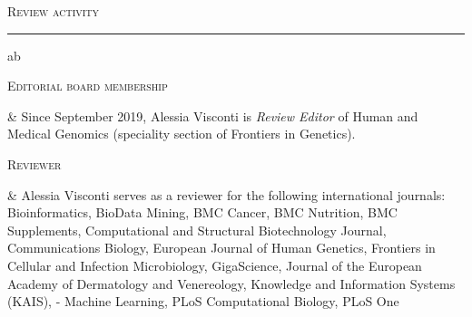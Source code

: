 \documentclass[a4paper,10pt]{article}
\newcommand{\mediumtitle}[1]{
	\vspace{0.2cm}
	{\noindent
	\Large \textsc{#1}\\[-2ex]
	\hrule
	\vspace{0.2cm}}
}
\newenvironment{singletablelist}
{	\vspace{-0.2cm}
	\begin{longtable}[!h]{ab}}{\end{longtable}
}
\newcommand{\stlist}[2]{
	\hspace{-3cm}
	\noindent
	\begin{minipage}{0.24\textwidth}
	\begin{flushright}
	\textsc{#1}
	\end{flushright}
	\end{minipage}
	& #2\\[0.2cm]
}
\begin{document}
\mediumtitle{Review activity}

\begin{singletablelist}

\stlist{Editorial board membership}{ Since September 2019, Alessia Visconti is \emph{Review Editor} of Human and Medical Genomics (speciality section of Frontiers in Genetics).}
\stlist{Reviewer}{ Alessia Visconti serves as a reviewer for the following international journals: Bioinformatics, BioData Mining, BMC Cancer, BMC Nutrition, BMC Supplements, Computational and Structural Biotechnology Journal, Communications Biology, European Journal of Human Genetics, Frontiers in Cellular and Infection Microbiology, GigaScience, Journal of the European Academy of Dermatology and Venereology, Knowledge and Information Systems (KAIS), - Machine Learning, PLoS Computational Biology, PLoS One
}
\end{singletablelist}
\end{document}
